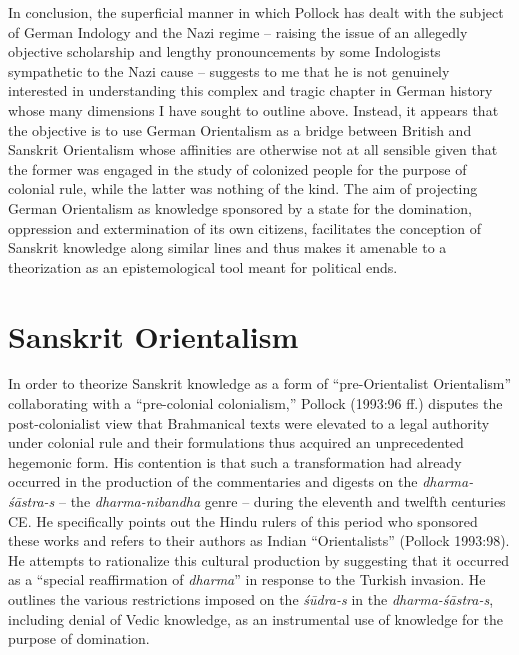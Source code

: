 In conclusion, the superficial manner in which Pollock has dealt with the subject of German Indology and the Nazi regime – raising the issue of an allegedly objective scholarship and lengthy pronouncements by some Indologists sympathetic to the Nazi cause – suggests to me that he is not genuinely interested in understanding this complex and tragic chapter in German history whose many dimensions I have sought to outline above. Instead, it appears that the objective is to use German Orientalism as a bridge between British and Sanskrit Orientalism whose affinities are otherwise not at all sensible given that the former was engaged in the study of colonized people for the purpose of colonial rule, while the latter was nothing of the kind. The aim of projecting German Orientalism as knowledge sponsored by a state for the domination, oppression and extermination of its own citizens, facilitates the conception of Sanskrit knowledge along similar lines and thus makes it amenable to a theorization as an epistemological tool meant for political ends.

\section*{Sanskrit Orientalism}

In order to theorize Sanskrit knowledge as a form of “pre-Orientalist Orientalism” collaborating with a “pre-colonial colonialism,” Pollock (1993:96 ff.) disputes the post-colonialist view that Brahmanical texts were elevated to a legal authority under colonial rule and their formulations thus acquired an unprecedented hegemonic form. His contention is that such a transformation had already occurred in the production of the commentaries and digests on the {\sl dharma-śāstra-s} – the {\sl dharma-nibandha} genre – during the eleventh and twelfth centuries CE. He specifically points out the Hindu rulers of this period who sponsored these works and refers to their authors as Indian “Orientalists” (Pollock 1993:98). He attempts to rationalize this cultural production by suggesting that it occurred as a “special reaffirmation of {\sl dharma}” in response to the Turkish invasion. He outlines the various restrictions imposed on the {\sl śūdra-s} in the {\sl dharma-śāstra-s}, including denial of Vedic knowledge, as an instrumental use of knowledge for the purpose of domination.
\newpage

